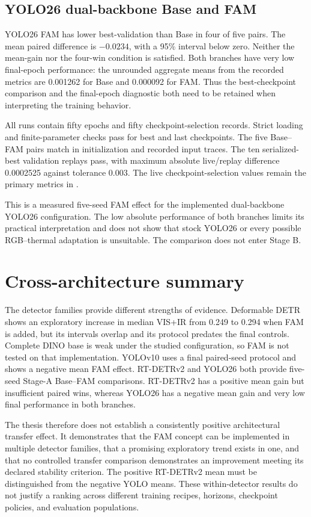 \subsection{YOLO26 dual-backbone Base and FAM}

YOLO26 FAM has lower best-validation \mapfifty{} than Base in four of
five pairs. The mean paired difference is \(-0.0234\), with a 95\% interval
below zero. Neither the mean-gain nor the four-win condition is satisfied.
Both branches have very low final-epoch performance: the unrounded aggregate
means from the recorded metrics are 0.001262 for Base and 0.000092 for
FAM. Thus the best-checkpoint comparison and the final-epoch diagnostic both
need to be retained when interpreting the training behavior.

All runs contain fifty epochs and fifty checkpoint-selection records.
Strict loading and finite-parameter checks pass for best and last checkpoints.
The five Base--FAM pairs match in initialization and recorded input traces.
The ten serialized-best validation replays pass, with maximum absolute
live/replay difference 0.0002525 against tolerance 0.003. The live
checkpoint-selection values remain the primary metrics in
.

This is a measured five-seed FAM effect for the implemented dual-backbone
YOLO26 configuration. The low absolute performance of both branches limits
its practical interpretation and does not show that stock YOLO26 or every
possible RGB--thermal adaptation is unsuitable. The comparison does not
enter Stage B.

\section{Cross-architecture summary}

The detector families provide different strengths of evidence.
Deformable DETR shows an exploratory increase in median VIS+IR from 0.249 to
0.294 when FAM is added, but its intervals overlap and its protocol predates
the final controls. Complete DINO base is weak under the studied configuration,
so FAM is not tested on that implementation. YOLOv10 uses a final paired-seed
protocol and shows a negative mean FAM effect. RT-DETRv2 and YOLO26 both
provide five-seed Stage-A Base--FAM comparisons. RT-DETRv2 has a positive
mean gain but insufficient paired wins, whereas YOLO26 has a negative mean
gain and very low final performance in both branches.

The thesis therefore does not establish a consistently positive architectural
transfer effect. It demonstrates that the FAM concept can be implemented in
multiple detector families, that a promising exploratory trend exists in one,
and that no controlled transfer comparison demonstrates an improvement
meeting its declared stability criterion. The positive RT-DETRv2 mean must
be distinguished from the negative YOLO means. These within-detector results
do not justify a ranking across different training recipes, horizons,
checkpoint policies, and evaluation populations.
